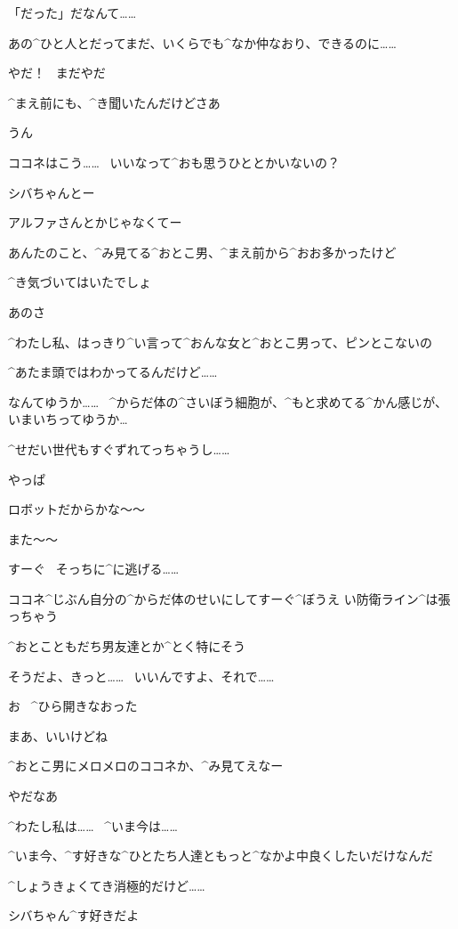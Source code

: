 \Kokone 「だった」だなんて……

\Kokone あの^{ひと}{人}とだってまだ、いくらでも^{なか}{仲}なおり、できるのに……

\Shiba やだ！
\ まだやだ

\page
\Shiba ^{まえ}{前}にも、^{き}{聞}いたんだけどさあ

\Kokone うん

\Shiba ココネはこう……
\ いいなって^{おも}{思}うひととかいないの？

\Kokone シバちゃんとー

\Shiba アルファさんとかじゃなくてー

\page
\Shiba あんたのこと、^{み}{見}てる^{おとこ}{男}、^{まえ}{前}から^{おお}{多}かったけど

\Shiba ^{き}{気}づいてはいたでしょ

\Shiba あのさ

\Kokone ^{わたし}{私}、はっきり^{い}{言}って^{おんな}{女}と^{おとこ}{男}って、ピンとこないの

\Kokone ^{あたま}{頭}ではわかってるんだけど……

\Kokone なんてゆうか……
\ ^{からだ}{体}の^{さいぼう}{細胞}が、^{もと}{求}めてる^{かん}{感}じが、いまいちってゆうか…

\Kokone ^{せだい}{世代}もすぐずれてっちゃうし……

\page
\Kokone やっぱ

\Kokone ロボットだからかな〜〜

\Shiba また〜〜

\Shiba すーぐ
\ そっちに^{に}{逃}げる……

\Shiba ココネ^{じぶん}{自分}の^{からだ}{体}のせいにしてすーぐ^{ぼうえ
  い}{防衛}ライン^{は}{張}っちゃう

\Shiba ^{おとこともだち}{男友達}とか^{とく}{特}にそう

\Kokone そうだよ、きっと……
\ いいんですよ、それで……

\Shiba お
\ ^{ひら}{開}きなおった

\page
\Shiba まあ、いいけどね

\Shiba ^{おとこ}{男}にメロメロのココネか、^{み}{見}てえなー

\Kokone やだなあ

\Kokone ^{わたし}{私}は……
\ ^{いま}{今}は……

\Kokone ^{いま}{今}、^{す}{好}きな^{ひとたち}{人達}ともっと^{なかよ}{中良}くしたいだけなんだ

\Shiba ^{しょうきょくてき}{消極的}だけど……

\page
\Kokone シバちゃん^{す}{好}きだよ

